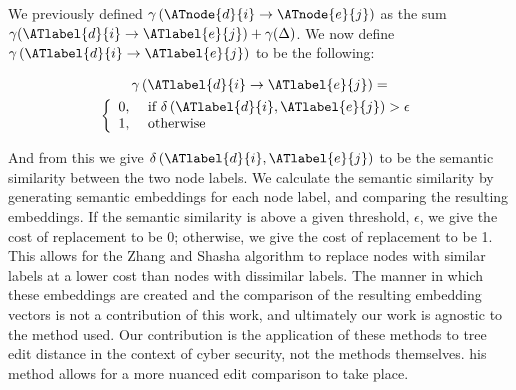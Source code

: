 We previously defined $\gamma\left(\ATnode{d}{i} \rightarrow \ATnode{e}{j}\right)$  as the sum $\gamma({\ATlabel{d}{i}} \rightarrow {\ATlabel{e}{j}}) + \gamma(\Delta)$. We now define $\gamma\left(\ATlabel{d}{i} \rightarrow \ATlabel{e}{j}\right)$ to be the following:

\begin{multline*}
    \gamma\left(\ATlabel{d}{i} \rightarrow \ATlabel{e}{j}\right)=\\\left\{\begin{array}{ll}
        0, & \text { if } \delta\left(\ATlabel{d}{i}, \ATlabel{e}{j}\right)>\epsilon \\
        1, & \text { otherwise }
    \end{array}\right.
\end{multline*}

And from this we give $\delta\left(\ATlabel{d}{i}, \ATlabel{e}{j}\right)$ to be the semantic similarity between the two node labels. We calculate the semantic similarity by generating semantic embeddings for each node label, and comparing the resulting embeddings. If the semantic similarity is above a given threshold, $\epsilon$, we give the cost of replacement to be 0; otherwise, we give the cost of replacement to be 1. This allows for the Zhang and Shasha algorithm to replace nodes with similar labels at a lower cost than nodes with dissimilar labels. The manner in which these embeddings are created and the comparison of the resulting embedding vectors is not a contribution of this work, and ultimately our work is agnostic to the method used. Our contribution is the application of these methods to tree edit distance in the context of cyber security, not the methods themselves. his method allows for a more nuanced edit comparison to take place.

